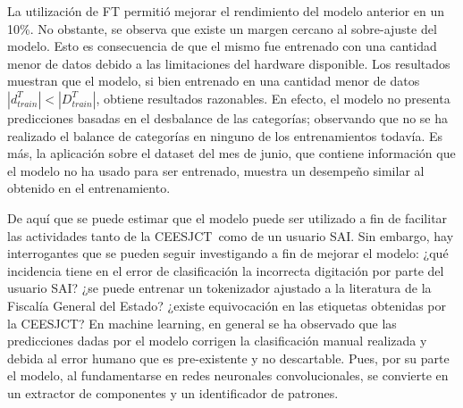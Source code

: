 \documentclass[onecolumn, journal, english, 12pt, a4paper]{IEEEtran} %
\newcommand{\printInicialesComision}{CEESJCT}
\theoremstyle{definition}
\begin{document}
La utilización de FT permitió mejorar el rendimiento del modelo
anterior en un 10\%. No obstante, se observa que existe un margen
cercano al sobre-ajuste del modelo. Esto es consecuencia de que el
mismo fue entrenado con una cantidad menor de datos debido a las
limitaciones del hardware disponible. Los resultados muestran que el
modelo, si bien entrenado en una cantidad menor de datos
$|d_{train}^T|<|D_{train}^T|$, obtiene resultados razonables. En
efecto, el modelo no presenta predicciones basadas en el desbalance de
las categorías; observando que no se ha realizado el balance de
categorías en ninguno de los entrenamientos todavía. Es más, la
aplicación sobre el dataset del mes de junio, que contiene información
que el modelo no ha usado para ser entrenado, muestra un desempeño
similar al obtenido en el entrenamiento.

De aquí que se puede estimar que el modelo puede ser utilizado a fin
de facilitar las actividades tanto de la \printInicialesComision\,
como de un usuario SAI. Sin embargo, hay interrogantes que se pueden
seguir investigando a fin de mejorar el modelo: ¿qué incidencia tiene
en el error de clasificación la incorrecta digitación por parte del
usuario SAI? ¿se puede entrenar un tokenizador ajustado a la
literatura de la Fiscalía General del Estado? ¿existe equivocación en
las etiquetas obtenidas por la \printInicialesComision? En machine
learning, en general se ha observado que las predicciones dadas por el
modelo corrigen la clasificación manual realizada y debida al error
humano que es pre-existente y no descartable. Pues, por su parte el
modelo, al fundamentarse en redes neuronales convolucionales, se
convierte en un extractor de componentes y un identificador de
patrones.
\end{document}
